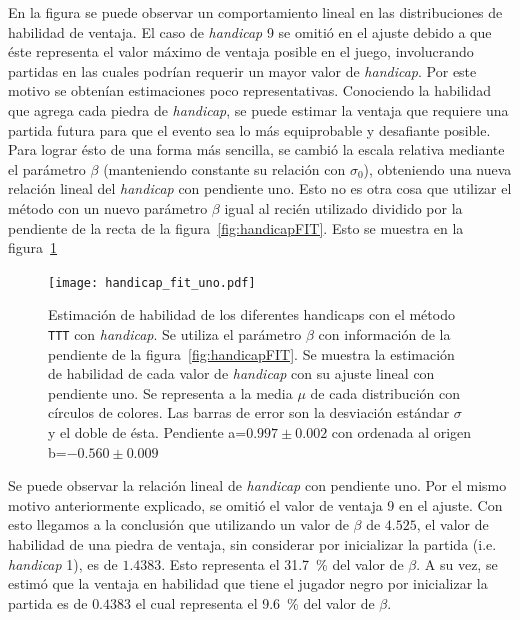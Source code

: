 \documentclass[11pt,twoside,spanish]{report} %
\begin{document}
En la figura se puede observar un comportamiento lineal en las distribuciones de habilidad de ventaja.
El caso de \textit{handicap} 9 se omiti\'o en el ajuste debido a que \'este representa el valor m\'aximo de ventaja posible en el juego, involucrando partidas en las cuales podr\'ian requerir un mayor valor de \textit{handicap}.
Por este motivo se obten\'ian estimaciones poco representativas.
Conociendo la habilidad que agrega cada piedra de \textit{handicap}, se puede estimar la ventaja que requiere una partida futura para que el evento sea lo m\'as equiprobable y desafiante posible.
Para lograr \'esto de una forma m\'as sencilla, se cambi\'o la escala relativa mediante el par\'ametro $\beta$ (manteniendo constante su relaci\'on con $\sigma_0$), obteniendo una nueva relaci\'on lineal del \textit{handicap} con pendiente uno.
Esto no es otra cosa que utilizar el m\'etodo con un nuevo par\'ametro $\beta$ igual al reci\'en utilizado dividido por la pendiente de la recta de la figura~\ref{fig:handicapFIT}.
Esto se muestra en la figura~\ref{fig:handicap_fit_uno}


\begin{figure}[H]
	\centering
    \texttt{[image: handicap\_fit\_uno.pdf]}
    \caption{Estimaci\'on de habilidad de los diferentes handicaps con el m\'etodo \texttt{TTT} con \textit{handicap}. Se utiliza el par\'ametro $\beta$ con informaci\'on de la pendiente de la figura~\ref{fig:handicapFIT}. Se muestra la estimaci\'on de habilidad de cada valor de \textit{handicap} con su ajuste lineal con pendiente uno. Se representa a la media $\mu$ de cada distribuci\'on con c\'irculos de colores.  Las barras de error son la desviaci\'on est\'andar $\sigma$ y el doble de \'esta.  Pendiente a=$0.997\pm0.002$ con ordenada al origen b=$-0.560\pm0.009$}
    \label{fig:handicap_fit_uno}
\end{figure}


Se puede observar la relaci\'on lineal de \textit{handicap} con pendiente uno.
Por el mismo motivo anteriormente explicado, se omiti\'o el valor de ventaja 9 en el ajuste.
Con esto llegamos a la conclusi\'on que utilizando un valor de $\beta$ de $4.525$, el valor de habilidad de una piedra de ventaja, sin considerar por inicializar la partida (i.e. \textit{handicap} 1), es de $1.4383$.
Esto representa el \SI{31.7}{\percent} del valor de $\beta$.
A su vez, se estim\'o que la ventaja en habilidad que tiene el jugador negro por inicializar la partida es de $0.4383$ el cual representa el \SI{9.6}{\percent} del valor de $\beta$.
\end{document}
